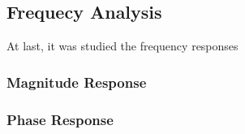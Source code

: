 \subsection{Frequecy Analysis}

At last, it was studied the frequency responses


\subsubsection{Magnitude Response}

\subsubsection{Phase Response}


